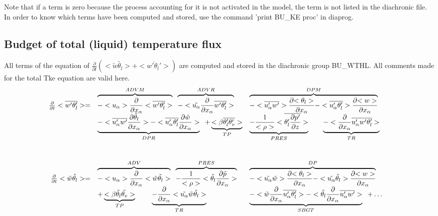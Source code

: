 Note that if a term is zero because the process accounting for it is
not activated in the model, the term is not listed in the diachronic file.
In order to know which terms have been computed and stored, use
the command 'print BU\_KE proc' in diaprog.\\ 

\subsection{Budget of total (liquid) temperature flux}

All terms of the equation of $\frac{\partial}{\partial t} (<\tilde{w}\tilde{\theta_l}> + <\overline{w'\theta_l'}>)$ are
computed and stored in the diachronic group BU\_WTHL. 
All comments made for the total Tke equation are valid here.\\

\begin{displaymath}
\left.
\begin{array}{rllll}
\frac{\partial }{\partial t} <\overline{w'\theta_l'}> = & 
\overbrace{- <u_\alpha>\frac{\partial}{\partial x_\alpha} <\overline{w'\theta_l'}> }^{ADVM} \;\;
\overbrace{- <\tilde{u_\alpha}\frac{\partial}{\partial x_\alpha} \overline{w'\theta_l'} > }^{ADVR} &
\overbrace{- <\overline{u_\alpha'w'}> \frac{\partial {<\theta_l>}}{\partial x_\alpha}
- <\overline{u'_\alpha \theta_l'}> \frac{\partial {<w>}}{\partial x_\alpha}}^{DPM} \\
\vspace*{1.0cm}
& \underbrace{- <\overline{u'_\alpha w'} \frac{\partial {\tilde{\theta_l}}}{\partial x_\alpha}>
- <\overline{u'_\alpha \theta_l'} \frac{\partial {\tilde{w}}}{\partial x_\alpha}>}_{DPR} \;\;
+ \underbrace{<\beta  \overline{\theta_l'\theta'_v}>}_{TP} &
\underbrace{- \frac{1}{<\rho>}<\overline{\theta_l' \frac{\partial p'}{\partial z}}>}_{PRES} \;\;\;\;\;\;\;
 \underbrace{- <\frac{\partial}{\partial x_\alpha} \overline{u'_\alpha w'\theta_l'}>}_{TR} \\
\frac{\partial }{\partial t} <\tilde{w}\tilde{\theta_l}> = & 
\overbrace{- <u_\alpha>\frac{\partial}{\partial x_\alpha} <\tilde{w}\tilde{\theta_l}> }^{ADV} \;\;
\overbrace{- \frac{1}{<\rho>}<\tilde{\theta_l} \frac{\partial \tilde{p}}{\partial x_\alpha}>}^{PRES} &
\overbrace{- <\tilde{u_\alpha} \tilde{w}> \frac{\partial {<\theta_l>}}{\partial x_\alpha}
- <\tilde{u_\alpha} \tilde{\theta_l}> \frac{\partial {<w>}}{\partial x_\alpha}}^{DP} &\\
&+ \underbrace{<\beta  \tilde{\theta_l}\tilde{\theta_v}>}_{TP} \;\;\;\;\;\;\;\;
 \underbrace{- \frac{\partial}{\partial x_\alpha} <\tilde{u_\alpha} \tilde{w}\tilde{\theta_l}>}_{TR} &
\underbrace{- <\tilde{w}\frac{\partial}{\partial x_\alpha}\overline{u'_\alpha \theta_l'}>
- <\tilde{\theta_l}\frac{\partial}{\partial x_\alpha}\overline{u'_\alpha w'}>}_{SBGT}\hspace{0.2cm} + \ldots&
\end{array}
\right.
\end{displaymath}


